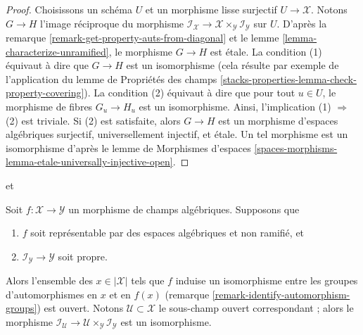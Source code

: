 \begin{proof}
Choisissons un schéma $U$ et un morphisme lisse surjectif $U \to \mathcal{X}$.
Notons $G \to H$ l'image réciproque du morphisme
$\mathcal{I}_\mathcal{X} \to
\mathcal{X} \times_\mathcal{Y} \mathcal{I}_\mathcal{Y}$
sur $U$. D'après la remarque \ref{remark-get-property-auts-from-diagonal} et le
lemme \ref{lemma-characterize-unramified}, le morphisme $G \to H$ est \'etale.
La condition (1) équivaut à dire que
$G \to H$ est un isomorphisme (cela résulte par exemple de l'application du
lemme de Propriétés des champs
\ref{stacks-properties-lemma-check-property-covering}).
La condition (2) équivaut à dire que
pour tout $u \in U$, le morphisme de fibres $G_u \to H_u$
est un isomorphisme. Ainsi, l'implication (1) $\Rightarrow$ (2) est triviale.
Si (2) est satisfaite, alors $G \to H$ est un morphisme d'espaces algébriques surjectif, universellement injectif,
et \'etale. Un tel morphisme est un isomorphisme d'après le
lemme de Morphismes d'espaces
\ref{spaces-morphisms-lemma-etale-universally-injective-open}.
\end{proof}

\begin{lemma}
\label{lemma-stabilizer-preserving-unramified}
\begin{reference}
\cite[Proposition 3.5]{rydh_quotients} et
\cite[Proposition 2.5]{alper_quotient}
\end{reference}
Soit $f : \mathcal{X} \to \mathcal{Y}$ un morphisme de champs algébriques.
Supposons que
\begin{enumerate}
\item $f$ soit représentable par des espaces algébriques et non ramifié, et
\item $\mathcal{I}_\mathcal{Y} \to \mathcal{Y}$ soit propre.
\end{enumerate}
Alors l'ensemble des $x \in |\mathcal{X}|$ tels que $f$ induise un
isomorphisme entre les groupes d'automorphismes en $x$ et en $f(x)$
(remarque \ref{remark-identify-automorphism-groups}) est ouvert.
Notons $\mathcal{U} \subset \mathcal{X}$ le sous-champ ouvert correspondant ;
alors le morphisme
$\mathcal{I}_\mathcal{U} \to
\mathcal{U} \times_\mathcal{Y} \mathcal{I}_\mathcal{Y}$
est un isomorphisme.
\end{lemma}

